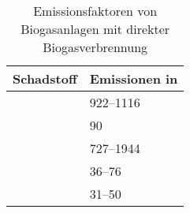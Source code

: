 {
\renewcommand{\arraystretch}{1.1}
\begin{table}[H]
	\begin{center}
		\caption{Emissionsfaktoren von Biogasanlagen mit direkter Biogasverbrennung \parencite{Paolini2018}}
		\begin{tabu} to 0.5\textwidth {| X | X[1.5] |}
			\hline
			Schadstoff	& Emissionen in \si[per-mode=symbol]{\mgkwh}					\\ \hline
					& \SIrange{922}{1116}{\relax}                               	\\
				& \SI{90}{\relax}                                       		\\
				& \SIrange{727}{1944}{\relax}                               	\\
				& \SIrange{36}{76}{\relax}                                  	\\
				& \SIrange{31}{50}{\relax}                                  	\\ \hline
		\end{tabu}
		\label{tab:tab_air-pollutants}
	\end{center}
\end{table}
}